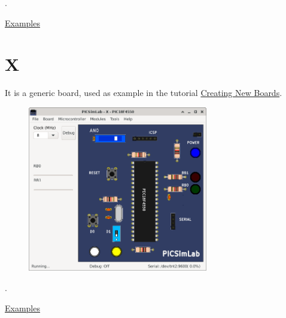 .\vspace{0.5cm}

\href{https://lcgamboa.github.io/picsimlab_examples/board_STM32_H103.html}{Examples}


\section{X}

It is a generic board, used as example in the tutorial 
\href{https://lcgamboa.github.io/picsimlab_docs/stable/CreatingNewBoards.html}{Creating New Boards}.

\begin{figure}[H]
\center
\includegraphics[width=0.7\textwidth]{img/X.png} 
\end{figure} 

.\vspace{0.5cm}

\href{https://lcgamboa.github.io/picsimlab_examples/board_X.html}{Examples}
